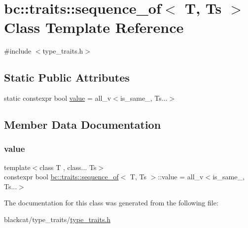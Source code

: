 \hypertarget{classbc_1_1traits_1_1sequence__of}{}\section{bc\+:\+:traits\+:\+:sequence\+\_\+of$<$ T, Ts $>$ Class Template Reference}
\label{classbc_1_1traits_1_1sequence__of}


{\ttfamily \#include $<$type\+\_\+traits.\+h$>$}

\subsection*{Static Public Attributes}
\begin{DoxyCompactItemize}
\item 
static constexpr bool \hyperlink{classbc_1_1traits_1_1sequence__of_ab6e3a9a7b8355f4257081cf6f315617c}{value} = all\+\_\+v$<$is\+\_\+same\+\_\+, Ts...$>$
\end{DoxyCompactItemize}


\subsection{Member Data Documentation}
\mbox{\label{classbc_1_1traits_1_1sequence__of_ab6e3a9a7b8355f4257081cf6f315617c}} 
\subsubsection{\texorpdfstring{value}{value}}
{\footnotesize\ttfamily template$<$class T , class... Ts$>$ \\
constexpr bool \hyperlink{classbc_1_1traits_1_1sequence__of}{bc\+::traits\+::sequence\+\_\+of}$<$ T, Ts $>$\+::value = all\+\_\+v$<$is\+\_\+same\+\_\+, Ts...$>$\hspace{0.3cm}{\ttfamily [static]}}



The documentation for this class was generated from the following file\+:\begin{DoxyCompactItemize}
\item 
blackcat/type\+\_\+traits/\hyperlink{type__traits_2type__traits_8h}{type\+\_\+traits.\+h}\end{DoxyCompactItemize}
